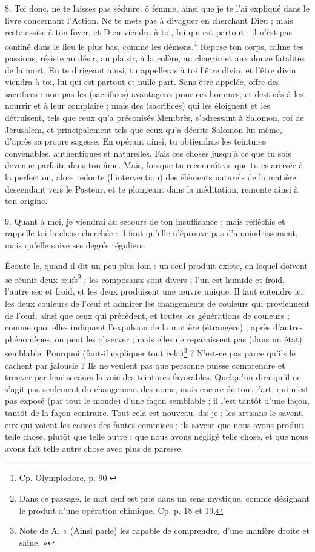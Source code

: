 \documentclass[a4paper, 11pt, oneside, polutonikogreek, french]{article}
\begin{document}
8. Toi donc, ne te laisses pas séduire, ô femme, ainsi que je te l'ai expliqué dans le livre concernant l'Action. Ne te mets pas à divaguer en cherchant Dieu ; mais reste assise à ton foyer, et Dieu viendra à toi, lui qui est partout ; il n'est pas confiné dans le lieu le plus bas, comme les démons.\footnote{Cp. Olympiodore, p. 90.} Repose ton corps, calme tes passions, résiste au désir, au plaisir, à la colère, au chagrin et aux douze fatalités de la mort. En te dirigeant ainsi, tu appelleras à toi l'être divin, et l'être divin viendra à toi, lui qui est partout et nulle part. Sans être appelée, offre des sacrifices : non pas les (sacrifices) avantageux pour ces hommes, et destinés à les nourrir et à leur complaire ; mais des (sacrifices) qui les éloignent et les détruisent, tels que ceux qu'a préconisés Membrès, s'adressant à Salomon, roi de Jérusalem, et principalement tels que ceux qu'a décrits Salomon lui-même, d'après sa propre sagesse. En opérant ainsi, tu obtiendras les teintures convenables, authentiques et naturelles. Fais ces choses jusqu'à ce que tu sois devenue parfaite dans ton âme. Mais, lorsque tu reconnaîtras que tu es arrivée à la perfection, alors redoute (l'intervention) des éléments naturels de la matière : descendant vers le Pasteur, et te plongeant dans la méditation, remonte ainsi à ton origine.

9. Quant à moi, je viendrai au secours de ton insuffisance ; mais réfléchis et rappelle-toi la chose cherchée : il faut qu'elle n'éprouve pas d'amoindrissement, mais qu'elle suive ses degrés réguliers.

Écoute-le, quand il dit un peu plus loin : un seul produit existe, en lequel doivent se réunir deux œufs\footnote{Dans ce passage, le mot œuf est pris dans un sens mystique, comme désignant le produit d'une opération chimique. Cp. p. 18 et 19.} ; les composants sont divers ; l'un est humide et froid, l'autre sec et froid, et les deux produisent une œuvre unique. Il faut entendre ici les deux couleurs de l'œuf et admirer les changements de couleurs qui proviennent de l'œuf, ainsi que ceux qui précèdent, et toutes les générations de couleurs ; comme quoi elles indiquent l'expulsion de la matière (étrangère) ; après d'autres phénomènes, on peut les observer ; mais elles ne reparaissent pas (dans un état) semblable. Pourquoi (faut-il expliquer tout cela)\footnote{Note de A. « (Ainsi parle) les capable de comprendre, d'une manière droite et saine. »} ? N'est-ce pas parce qu'ils le cachent par jalousie ? Ils ne veulent pas que personne puisse comprendre et trouver par leur secours la voie des teintures favorables. Quelqu'un dira qu'il ne s'agit pas seulement du changement des noms, mais encore de tout l'art, qui n'est pas exposé (par tout le monde) d'une façon semblable ; il l'est tantôt d'une façon, tantôt de la façon contraire. Tout cela est nouveau, dis-je ; les artisans le savent, eux qui voient les causes des fautes commises ; ils savent que nous avons produit telle chose, plutôt que telle autre ; que nous avons négligé telle chose, et que nous avons fait telle autre chose avec plus de paresse.
\end{document}
